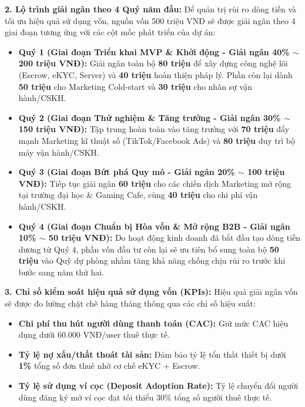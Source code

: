 \textbf{2. Lộ trình giải ngân theo 4 Quý năm đầu:}
Để quản trị rủi ro dòng tiền và tối ưu hiệu quả sử dụng vốn, nguồn vốn 500 triệu VNĐ sẽ được giải ngân theo 4 giai đoạn tương ứng với các cột mốc phát triển của dự án:

\begin{itemize}
    \item \textbf{Quý 1 (Giai đoạn Triển khai MVP \& Khởi động - Giải ngân 40\% $\sim$ 200 triệu VNĐ):}
    Giải ngân toàn bộ \textbf{80 triệu} để xây dựng công nghệ lõi (Escrow, eKYC, Server) và \textbf{40 triệu} hoàn thiện pháp lý. Phần còn lại dành \textbf{50 triệu} cho Marketing Cold-start và \textbf{30 triệu} cho nhân sự vận hành/CSKH.
    
    \item \textbf{Quý 2 (Giai đoạn Thử nghiệm \& Tăng trưởng - Giải ngân 30\% $\sim$ 150 triệu VNĐ):}
    Tập trung hoàn toàn vào tăng trưởng với \textbf{70 triệu} đẩy mạnh Marketing kĩ thuật số (TikTok/Facebook Ads) và \textbf{80 triệu} duy trì bộ máy vận hành/CSKH.
    
    \item \textbf{Quý 3 (Giai đoạn Bứt phá Quy mô - Giải ngân 20\% $\sim$ 100 triệu VNĐ):}
    Tiếp tục giải ngân \textbf{60 triệu} cho các chiến dịch Marketing mở rộng tại trường đại học \& Gaming Cafe, cùng \textbf{40 triệu} cho chi phí vận hành/CSKH.
    
    \item \textbf{Quý 4 (Giai đoạn Chuẩn bị Hòa vốn \& Mở rộng B2B - Giải ngân 10\% $\sim$ 50 triệu VNĐ):}
    Do hoạt động kinh doanh đã bắt đầu tạo dòng tiền dương từ Quý 4, phần vốn đầu tư còn lại sẽ ưu tiên bổ sung toàn bộ \textbf{50 triệu} vào Quỹ dự phòng nhằm tăng khả năng chống chịu rủi ro trước khi bước sang năm thứ hai.
\end{itemize}

\textbf{3. Chỉ số kiểm soát hiệu quả sử dụng vốn (KPIs):}
Hiệu quả giải ngân vốn sẽ được đo lường chặt chẽ hàng tháng thông qua các chỉ số hiệu suất:
\begin{itemize}
    \item \textbf{Chi phí thu hút người dùng thanh toán (CAC):} Giữ mức CAC hiệu dụng dưới 60.000 VNĐ/user thuê thực tế.
    \item \textbf{Tỷ lệ nợ xấu/thất thoát tài sản:} Đảm bảo tỷ lệ tổn thất thiết bị dưới \textbf{1\%} tổng số đơn thuê nhờ cơ chế eKYC + Escrow.
    \item \textbf{Tỷ lệ sử dụng ví cọc (Deposit Adoption Rate):} Tỷ lệ chuyển đổi người dùng đăng ký mở ví cọc đạt tối thiểu 30\% tổng số người thuê thực tế.
\end{itemize}

